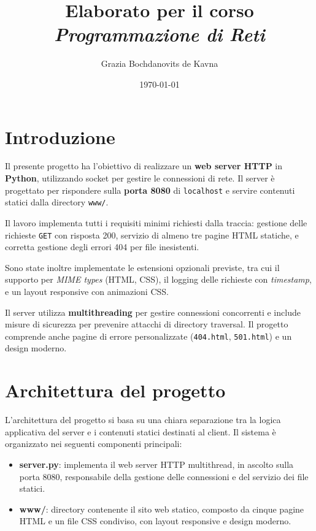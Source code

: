 \documentclass[a4paper,12pt]{report}
\title{Elaborato per il corso \\ \textit{Programmazione di Reti}}
\author{Grazia Bochdanovits de Kavna}
\date{\today}
\begin{document}
\maketitle

\tableofcontents

\chapter{Introduzione}

Il presente progetto ha l'obiettivo di realizzare un \textbf{web server HTTP} in \textbf{Python}, utilizzando socket per gestire le connessioni di rete. 
Il server è progettato per rispondere sulla \textbf{porta 8080} di \texttt{localhost} e servire contenuti statici dalla directory \texttt{www/}.

Il lavoro implementa tutti i requisiti minimi richiesti dalla traccia: gestione delle richieste \texttt{GET} con risposta 200, servizio di almeno tre pagine HTML statiche, e corretta gestione degli errori 404 per file inesistenti. 

Sono state inoltre implementate le estensioni opzionali previste, tra cui il supporto per \textit{MIME types} (HTML, CSS), il logging delle richieste con \textit{timestamp}, e un layout responsive con animazioni CSS.

Il server utilizza \textbf{multithreading} per gestire connessioni concorrenti e include misure di sicurezza per prevenire attacchi di directory traversal. 
Il progetto comprende anche pagine di errore personalizzate (\texttt{404.html}, \texttt{501.html}) e un design moderno.

\chapter{Architettura del progetto}

L'architettura del progetto si basa su una chiara separazione tra la logica applicativa del server e i contenuti statici destinati al client. 
Il sistema è organizzato nei seguenti componenti principali:

\begin{itemize}
    \item \textbf{server.py}: implementa il web server HTTP multithread, in ascolto sulla porta 8080, responsabile della gestione delle connessioni e del servizio dei file statici.
    \item \textbf{www/}: directory contenente il sito web statico, composto da cinque pagine HTML e un file CSS condiviso, con layout responsive e design moderno.
\end{itemize}
\end{document}
